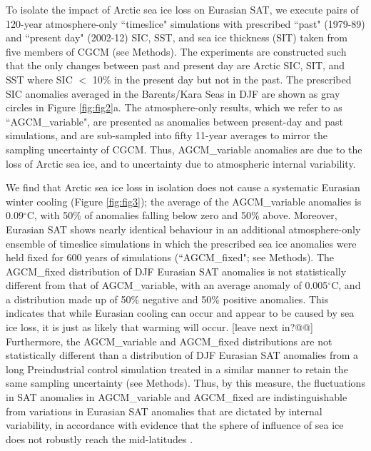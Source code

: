 \documentclass{nature}
\begin{document}
To isolate the impact of Arctic sea ice loss on Eurasian SAT, we execute pairs of 120-year atmosphere-only ``timeslice" simulations with prescribed ``past" (1979-89) and ``present day" (2002-12) SIC, SST, and sea ice thickness (SIT) taken from five members of CGCM (see Methods). The experiments are constructed such that the only changes between past and present day are Arctic SIC, SIT, and SST where SIC $<$ 10\% in the present day but not in the past. The prescribed SIC anomalies averaged in the Barents/Kara Seas in DJF are shown as gray circles in Figure \ref{fig:fig2}a. The atmosphere-only results, which we refer to as ``AGCM\_variable", are presented as anomalies between present-day and past simulations, and are sub-sampled into fifty 11-year averages to mirror the sampling uncertainty of CGCM. Thus, AGCM\_variable anomalies are due to the loss of Arctic sea ice, and to uncertainty due to atmospheric internal variability. %

We find that Arctic sea ice loss in isolation does not cause a systematic Eurasian winter cooling (Figure \ref{fig:fig3}); the average of the AGCM\_variable anomalies is 0.09$^\circ$C, with 50\% of anomalies falling below zero and 50\% above. Moreover, Eurasian SAT shows nearly identical behaviour in an additional atmosphere-only ensemble of timeslice simulations in which the prescribed sea ice anomalies were held fixed for 600 years of simulations (``AGCM\_fixed"; see Methods). The AGCM\_fixed distribution of DJF Eurasian SAT anomalies is not statistically different from that of AGCM\_variable, with an average anomaly of 0.005$^\circ$C, and a distribution made up of 50\% negative and 50\% positive anomalies. This indicates that while Eurasian cooling can occur and appear to be caused by sea ice loss, it is just as likely that warming will occur. [leave next in?@@] Furthermore, the AGCM\_variable and AGCM\_fixed distributions are not statistically different than a distribution of DJF Eurasian SAT anomalies from a long Preindustrial control simulation treated in a similar manner to retain the same sampling uncertainty (see Methods). Thus, by this measure, the fluctuations in SAT anomalies in AGCM\_variable and AGCM\_fixed are indistinguishable from variations in Eurasian SAT anomalies that are dictated by internal variability, in accordance with evidence that the sphere of influence of sea ice does not robustly reach the mid-latitudes \cite{screen14a}.  %
\end{document}
